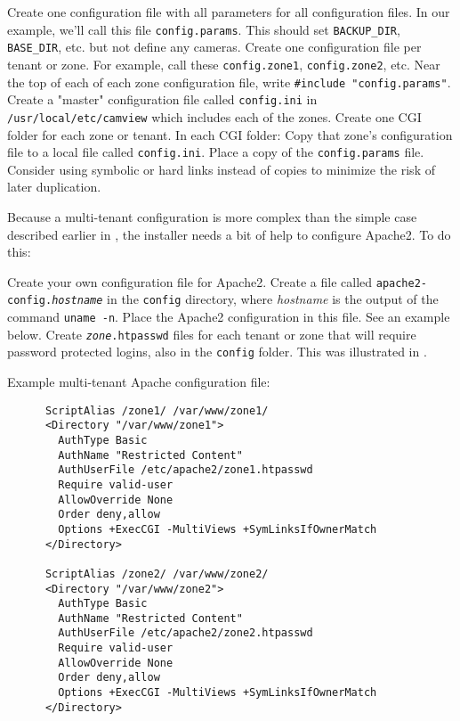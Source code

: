     \BI
    \I Create one configuration file with all parameters for all
       configuration files.  In our example, we'll call this file
       \texttt{config.params}.  This should set \texttt{BACKUP\_DIR},
       \texttt{BASE\_DIR}, etc. but not define any cameras.
    \I Create one configuration file per tenant or zone.  For example, call these
       \texttt{config.zone1}, \texttt{config.zone2}, etc.  Near the top of
       each of each zone configuration file, write \texttt{\#include "config.params"}.
    \I Create a "master" configuration file called \texttt{config.ini} in
       \texttt{/usr/local/etc/camview} which includes each of the zones.
    \I Create one CGI folder for each zone or tenant.
    \I In each CGI folder:
       \BI
       \I Copy that zone's configuration file to a local file called
          \texttt{config.ini}.
       \I Place a copy of the \texttt{config.params} file.
       \EI
       Consider using symbolic or hard links instead of copies to minimize
       the risk of later duplication.
    \EI

    Because a multi-tenant configuration is more complex than the simple
    case described earlier in , the installer needs a bit
    of help to configure Apache2.  To do this:
    
    \BE
    \I Create your own configuration file for Apache2.  Create a file
       called \texttt{apache2-config.\emph{hostname}} in the
       \texttt{config} directory, where \emph{hostname} is the output
       of the command \texttt{uname -n}.
    \I Place the Apache2 configuration in this file.  See an example below.
    \I Create \texttt{\emph{zone}.htpasswd} files for each tenant or zone
       that will require password protected logins, also in the \texttt{config}
       folder.  This was illustrated in .
    \EE

    Example multi-tenant Apache configuration file:
    \begin{verbatim}
      ScriptAlias /zone1/ /var/www/zone1/
      <Directory "/var/www/zone1">
        AuthType Basic
        AuthName "Restricted Content"
        AuthUserFile /etc/apache2/zone1.htpasswd
        Require valid-user
        AllowOverride None
        Order deny,allow
        Options +ExecCGI -MultiViews +SymLinksIfOwnerMatch
      </Directory>

      ScriptAlias /zone2/ /var/www/zone2/
      <Directory "/var/www/zone2">
        AuthType Basic
        AuthName "Restricted Content"
        AuthUserFile /etc/apache2/zone2.htpasswd
        Require valid-user
        AllowOverride None
        Order deny,allow
        Options +ExecCGI -MultiViews +SymLinksIfOwnerMatch
      </Directory>
    \end{verbatim}

